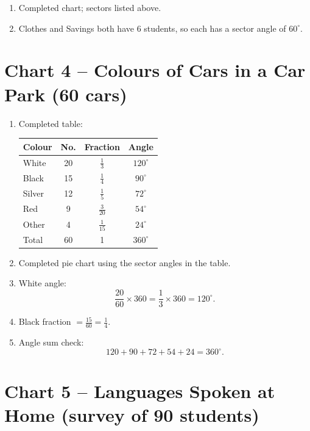 \documentclass[a4paper,12pt]{article}
\begin{document}
\begin{enumerate}[leftmargin=1.6em, itemsep=2pt]
  \item Completed chart; sectors listed above.
  \item Clothes and Savings both have 6 students, so each has a sector angle of \(60^\circ\).
\end{enumerate}

\section*{Chart 4 -- Colours of Cars in a Car Park (60 cars)}

\begin{enumerate}[leftmargin=1.6em, itemsep=2pt]
  \item Completed table:
  \begin{center}
    \renewcommand{\arraystretch}{1.3}
    \begin{tabular}{lccc}
      \hline
      \textbf{Colour} & \textbf{No.} & \textbf{Fraction} & \textbf{Angle}\\
      \hline
      White  & 20 & \(\frac{1}{3}\)  & \(120^\circ\)\\
      Black  & 15 & \(\frac{1}{4}\)  & \(90^\circ\)\\
      Silver & 12 & \(\frac{1}{5}\)  & \(72^\circ\)\\
      Red    &  9 & \(\frac{3}{20}\) & \(54^\circ\)\\
      Other  &  4 & \(\frac{1}{15}\) & \(24^\circ\)\\
      \hline
      Total  & 60 & 1 & \(360^\circ\)\\
      \hline
    \end{tabular}
  \end{center}
  \item Completed pie chart using the sector angles in the table.
  \item White angle:
  \[
  \frac{20}{60}\times360=\frac{1}{3}\times360=120^\circ.
  \]
  \item Black fraction \(=\frac{15}{60}=\frac{1}{4}\).
  \item Angle sum check:
  \[
  120+90+72+54+24=360^\circ.
  \]
\end{enumerate}

\section*{Chart 5 -- Languages Spoken at Home (survey of 90 students)}
\end{document}

